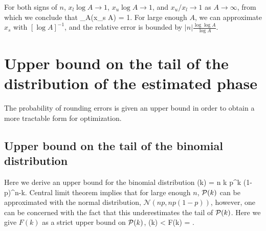 For both signs of $n$, $x_l \log A 
\rightarrow 1$, $x_u \log A
\rightarrow 1$, and $x_u/x_l\rightarrow 1$ as $A\rightarrow \infty$, from which
we conclude that
\bel
	\lim_{A\rightarrow \infty}(x_s \log A) = 1.
\eel
For large enough $A$, we can approximate $x_s$ with $[\log A]^{-1}$, and the
relative error is bounded by $|n|\frac{\log\log A}{\log A}$.


\section{Upper bound on the tail of the distribution of the estimated phase}
\label{sec:UpperBound}
The probability of rounding errors is given an upper bound in order to obtain a
more tractable form for optimization. 

\subsection{Upper bound on the tail of the binomial distribution}
\label{sec:Binomial} 
Here we derive an upper bound for the binomial distribution
\bel
	\label{eq:binomial}
	\PP(k) = {n \choose k} p^{k} (1-p)^{n-k}.
\eel
Central limit theorem implies that for large enough $n$, $\mathcal{P}(k)$ can be
approximated with the normal distribution, $\mathcal{N}(np, np(1-p))$,
however, one can be concerned with the fact that this underestimates the tail of
$\mathcal{P}(k)$. Here we give $F(k)$ as a strict upper bound on
$\mathcal{P}(k)$,
\bel
	\label{eq:Upper bound}
	\PP(k) < F(k) = \exp{}.
\eel
% 
% 
% 

